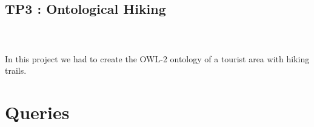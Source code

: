 \documentclass[14pt]
{article}
\begin{document}
\pagestyle{fancy}

\bigskip
\begin{center}
	\section*{\textbf{{\LARGE TP3 : Ontological Hiking}}}
\end{center}
\bigskip\bigskip\bigskip
\paragraph*{\\} 
In this project we had to create the OWL-2 ontology of a tourist area with hiking trails.

\section{Queries}
\end{document}
